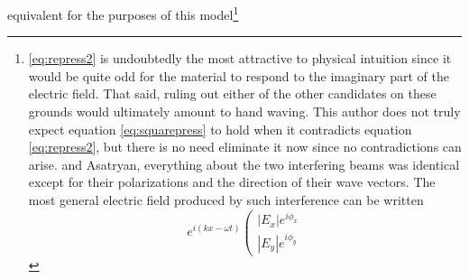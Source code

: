 \documentclass[twocolumn,showpacs,preprintnumbers,amsmath,amssymb]{revtex4}
\begin{document}
equivalent for the purposes of this model\footnote{ %
\ref{eq:repress2} is undoubtedly the most attractive to physical intuition since it would
be quite odd for the material to respond to the imaginary part of the electric field.
That said, ruling out either of the other candidates on these grounds would ultimately
amount to hand waving. This author does not truly expect equation \ref{eq:squarepress} to
hold when it contradicts equation \ref{eq:repress2}, but there is no need eliminate it
now since no contradictions can arise. %
and Asatryan, everything about the two interfering beams was identical except for their
polarizations and the direction of their wave vectors. The most general electric field
produced by such interference can be written
\begin{equation}
e^{i\left(kx-\omega t\right)} \left(
\begin{array}{c}
                                                                                                                                                                                                                                                                                                                                                                                                                                                                                                                                                                                                                                                                                                                                                                                                                                                                                                                                                                                                                                                                \left|E_x\right| e^{i\phi_x}\\
                                                                                                                                                                                                                                                                                                                                                                                                                                                                                                                                                                                                                                                                                                                                                                                                                                                                                                                                                                                                                                                                \left|E_y\right| e^{i\phi_y}

\end{array}
\end{equation}}
\end{document}
